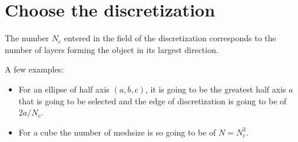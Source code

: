 \section{Choose the discretization}

The number $N_c$ entered in the field of the discretization
corresponds to the number of layers forming the object in its largest
direction.

A few examples:

\begin{itemize} 
\item For an ellipse of half axis $(a,b,c)$, it is going to be the
  greatest half axis $a$ that is going to be selected and the edge of
  discretization is going to be of $2a/N_c$.
\item For a cube the number of meshsize is so going to be of
  $N=N_c^3$.
\end{itemize}
